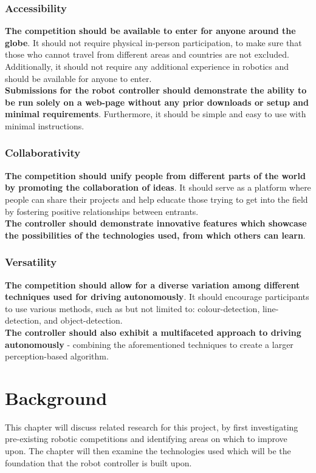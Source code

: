 \documentclass{l4proj}
\begin{document}
\subsection{Accessibility}
\textbf{The competition should be available to enter for anyone around the globe}. It should not require physical in-person participation, to make sure that those who cannot travel from different areas and countries are not excluded. Additionally, it should not require any additional experience in robotics and should be available for anyone to enter. 
\\
\textbf{Submissions for the robot controller should demonstrate the ability to be run solely on a web-page without any prior downloads or setup and minimal requirements}. Furthermore, it should be simple and easy to use with minimal instructions.

\subsection{Collaborativity}
\textbf{The competition should unify people from different parts of the world by promoting the collaboration of ideas}. It should serve as a platform where people can share their projects and help educate those trying to get into the field by fostering positive relationships between entrants.
\\
\textbf{The controller should demonstrate innovative features which showcase the possibilities of the technologies used, from which others can learn}.

\subsection{Versatility}
\textbf{The competition should allow for a diverse variation among different techniques used for driving autonomously}. It should encourage participants to use various methods, such as but not limited to: colour-detection, line-detection, and object-detection. 
\\
\textbf{The controller should also exhibit a multifaceted approach to driving autonomously} - combining the aforementioned techniques to create a larger perception-based algorithm.

\chapter{Background}
This chapter will discuss related research for this project, by first investigating pre-existing robotic competitions and identifying areas on which to improve upon. The chapter will then examine the technologies used which will be the foundation that the robot controller is built upon.
\end{document}
